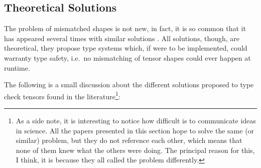 \subsection{Theoretical Solutions}\label{theoretical-solutions}

The problem of mismatched shapes is not new, in fact, it is so common
that it has appeared several times with similar solutions
\autocites{arnold_specifying_2010}{griffioen_type_2015}{rink_modeling_2018}{slepak_array-oriented_2014}{trojahner_dependently_2009}.
All solutions, though, are theoretical, they propose type systems which,
if were to be implemented, could warranty type safety, i.e.~no
mismatching of tensor shapes could ever happen at runtime.

The following is a small discussion about the different solutions
proposed to type check tensors found in the literature\footnote{As a
  side note, it is interesting to notice how difficult is to communicate
  ideas in science. All the papers presented in this section hope to
  solve the same (or similar) problem, but they do not reference each
  other, which means that none of them knew what the others were doing.
  The principal reason for this, I think, it is because they all called
  the problem differently.}:


